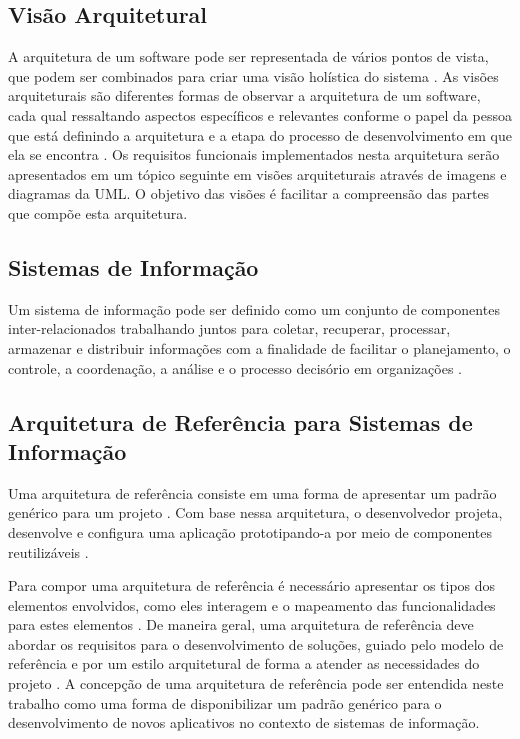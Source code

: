 \subsection{Visão Arquitetural}
A arquitetura de um software pode ser representada de vários pontos de vista, que podem ser combinados para criar uma visão holística do sistema \cite{guideline:architectural_view}. As visões arquiteturais são diferentes formas de observar a arquitetura de um software, cada qual ressaltando aspectos específicos e relevantes conforme o papel da pessoa que está definindo a arquitetura e a etapa do processo de desenvolvimento em que ela se encontra \cite{Raymond1995}. Os requisitos funcionais implementados nesta arquitetura serão apresentados em um tópico seguinte em visões arquiteturais através de imagens e diagramas da UML. O objetivo das visões é facilitar a compreensão das partes que compõe esta arquitetura.


\subsection{Sistemas de Informação}
Um sistema de informação pode ser definido como um conjunto de componentes inter-relacionados trabalhando juntos para coletar, recuperar, processar, armazenar e distribuir informações com a finalidade de facilitar o planejamento, o controle, a coordenação, a análise e o processo decisório em organizações \cite{laudon}.


\subsection{Arquitetura de Referência para Sistemas de Informação}
Uma arquitetura de referência consiste em uma forma de apresentar um padrão genérico para um projeto \cite{zambiasi}. Com base nessa arquitetura, o desenvolvedor projeta, desenvolve e configura uma aplicação prototipando-a por meio de componentes reutilizáveis \cite{zambiasi}.\par

Para compor uma arquitetura de referência é necessário apresentar os tipos dos elementos envolvidos, como eles interagem e o mapeamento das funcionalidades para estes elementos \cite{Hofmeister:1999:ASA:322640}. De maneira geral, uma arquitetura de referência deve abordar os requisitos para o desenvolvimento de soluções, guiado pelo modelo de referência e por um estilo arquitetural de forma a atender as necessidades do projeto \cite{c._k_f._2006}. A concepção de uma arquitetura de referência pode ser entendida neste trabalho como uma forma de disponibilizar um padrão genérico para o desenvolvimento de novos aplicativos no contexto de sistemas de informação.\par


